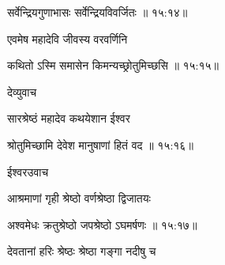 
{\devanagarifont सर्वेन्द्रियगुणाभासः सर्वेन्द्रियविवर्जितः {॥ १५:१४॥} \veg\dontdisplaylinenum }%

{\devanagarifont एवमेष महादेवि जीवस्य वरवर्णिनि \thinspace{\dandab} \dontdisplaylinenum }%
 

{\devanagarifont कथितो ऽस्मि समासेन किमन्यच्छ्रोतुमिच्छसि {॥ १५:१५॥} \veg\dontdisplaylinenum }%


{\devanagarifont देव्युवाच {\dandab}\dontdisplaylinenum  }%
 
{\devanagarifont सारश्रेष्ठं महादेव कथयेशान ईश्वर \thinspace{\danda} \dontdisplaylinenum }%


{\devanagarifont श्रोतुमिच्छामि देवेश मानुषाणां हितं वद {॥ १५:१६॥} \veg\dontdisplaylinenum }%

{\devanagarifont ईश्वरउवाच {\dandab}\dontdisplaylinenum  }%

{\devanagarifont आश्रमाणां गृही श्रेष्ठो वर्णश्रेष्ठा द्विजातयः \thinspace{\danda} \dontdisplaylinenum }%


{\devanagarifont अश्वमेधः क्रतुश्रेष्ठो जपश्रेष्ठो ऽघमर्षणः {॥ १५:१७॥} \veg\dontdisplaylinenum }%

{\devanagarifont देवतानां हरिः श्रेष्ठः श्रेष्ठा गङ्गा नदीषु च \thinspace{\dandab} \dontdisplaylinenum }%

